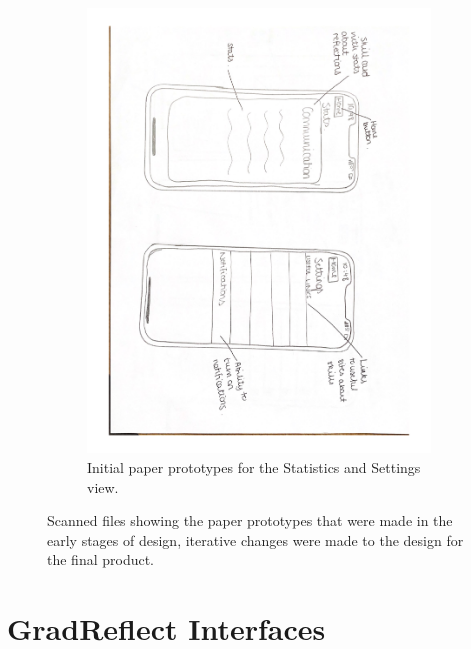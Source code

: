 \documentclass{l4proj}
\begin{document}
\begin{appendices}
\begin{figure}
\begin{subfigure}[b]{1\textwidth}
        \includegraphics[scale=0.45, angle = 90]{images/PaperWireframes2.pdf}
        \caption{Initial paper prototypes for the Statistics and Settings view.}
        \label{fig:PaperWireframe2}
    \end{subfigure}     
    \caption{Scanned files showing the paper prototypes that were made in the early stages of design, iterative changes were made to the design for the final product.}
    \label{fig:PaperPrototypes}
\end{figure}

\section{GradReflect Interfaces} \label{Appendix-AppInterfaces}


\end{appendices}
\end{document}
